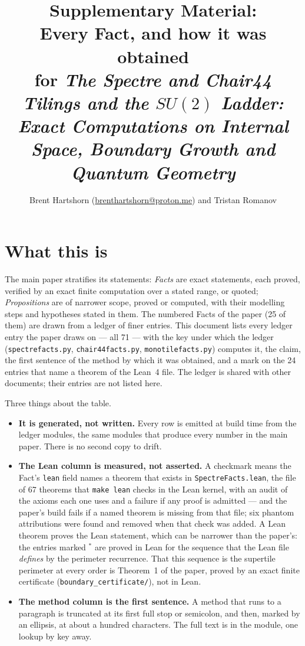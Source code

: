 \documentclass[10pt]{article}
\title{\vspace{-1cm}
\textbf{Supplementary Material:} \\ Every Fact, and how it was obtained \\
{\large for \emph{The Spectre and Chair44 Tilings and the $SU(2)$ Ladder: Exact Computations on Internal Space, Boundary Growth and Quantum Geometry}}}
\author{Brent Hartshorn \orcidlink{0009-0004-2853-655X}
        (\url{brenthartshorn@proton.me}) and Tristan Romanov}
\newcommand{\code}[1]{\texttt{#1}}
\begin{document}
\maketitle


\section*{What this is}

The main paper stratifies its statements: \emph{Facts} are exact statements,
each proved, verified by an exact finite computation over a stated range, or
quoted; \emph{Propositions} are of narrower scope, proved or computed, with their
modelling steps and hypotheses stated in them.  The numbered Facts of the
paper (25 of them) are drawn from a ledger of finer entries.  This document
lists every ledger entry the paper draws on --- all 71 --- with the key under
which the ledger (\code{spectrefacts.py}, \code{chair44facts.py},
\code{monotilefacts.py}) computes it, the claim, the first sentence of the
method by which it was obtained, and a mark on the 24 entries that name a
theorem of the Lean~4 file.  The ledger is shared with other documents; their
entries are not listed here.

Three things about the table.

\begin{itemize}
\item \textbf{It is generated, not written.}  Every row is emitted at build
  time from the ledger modules, the same modules that produce every
  number in the main paper.  There is no second copy to drift.

\item \textbf{The Lean column is measured, not asserted.}  A checkmark means
  the Fact's \code{lean} field names a theorem that exists in
  \code{SpectreFacts.lean}, the file of 67 theorems that \code{make lean}
  checks in the Lean kernel, with an audit of the axioms each one uses and a
  failure if any proof is admitted --- and the paper's build fails if a named
  theorem is missing from that file; six
  phantom attributions were found and removed when that check was added.  A
  Lean theorem proves the Lean statement, which can be narrower than the
  paper's: the entries marked $^{*}$ are proved in Lean for the sequence that the
  Lean file \emph{defines} by the perimeter recurrence.  That this sequence
  is the supertile perimeter at every order is Theorem~1 of the paper,
  proved by an exact finite certificate
  (\code{boundary\_certificate/}), not in Lean.

\item \textbf{The method column is the first sentence.}  A method that runs
  to a paragraph is truncated at its first full stop or semicolon, and
  then, marked by an ellipsis, at about a hundred characters.  The full
  text is in the module, one lookup by key away.
\end{itemize}
\end{document}

